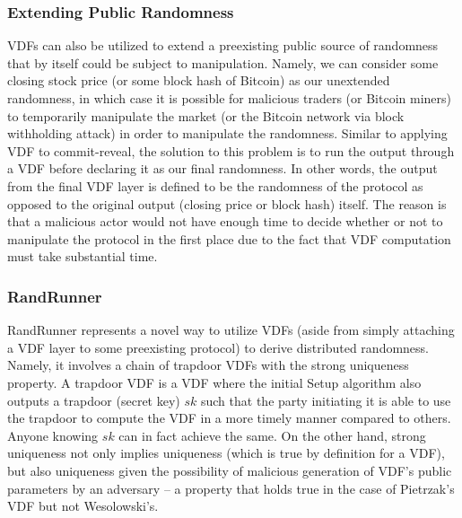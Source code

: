 \documentclass[letterpaper,twocolumn,10pt]{article}
\theoremstyle{definition}
\theoremstyle{remark}
\begin{document}
\subsubsection{Extending Public Randomness}
VDFs can also be utilized to extend a preexisting public source of randomness that by itself could be subject to manipulation. Namely, we can consider some closing stock price (or some block hash of Bitcoin) as our unextended randomness, in which case it is possible for malicious traders (or Bitcoin miners) to temporarily manipulate the market (or the Bitcoin network via block withholding attack) in order to manipulate the randomness. Similar to applying VDF to commit-reveal, the solution to this problem is to run the output through a VDF before declaring it as our final randomness. In other words, the output from the final VDF layer is defined to be the randomness of the protocol as opposed to the original output (closing price or block hash) itself. The reason is that a malicious actor would not have enough time to decide whether or not to manipulate the protocol in the first place due to the fact that VDF computation must take substantial time.

\subsubsection{RandRunner}
RandRunner represents a novel way to utilize VDFs (aside from simply attaching a VDF layer to some preexisting protocol) to derive distributed randomness. Namely, it involves a chain of trapdoor VDFs with the strong uniqueness property. A trapdoor VDF is a VDF where the initial Setup algorithm also outputs a trapdoor (secret key) $sk$ such that the party initiating it is able to use the trapdoor to compute the VDF in a more timely manner compared to others. Anyone knowing $sk$ can in fact achieve the same. On the other hand, strong uniqueness not only implies uniqueness (which is true by definition for a VDF), but also uniqueness given the possibility of malicious generation of VDF's public parameters by an adversary -- a property that holds true in the case of Pietrzak's VDF but not Wesolowski's.
\end{document}
